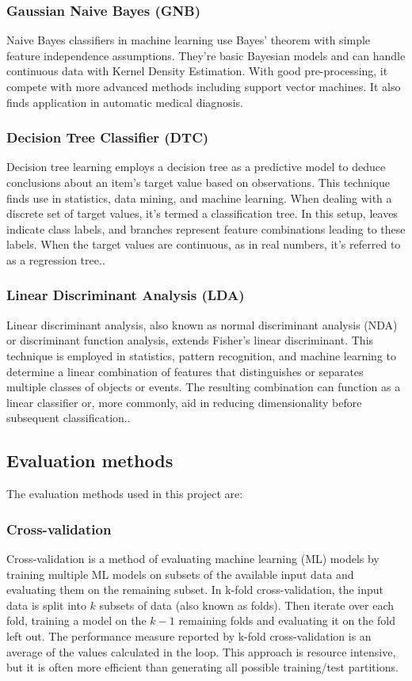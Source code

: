 	\subsubsection*{Gaussian Naive Bayes (GNB)}
		Naive Bayes classifiers in machine learning use Bayes' theorem with simple feature independence assumptions. They're basic Bayesian models and can handle continuous data with Kernel Density Estimation. With good pre-processing, it compete with more advanced methods including support vector machines. It also finds application in automatic medical diagnosis\cite{perez2006supervised}.
	
	\subsubsection*{Decision Tree Classifier (DTC)}
		Decision tree learning employs a decision tree as a predictive model to deduce conclusions about an item's target value based on observations. This technique finds use in statistics, data mining, and machine learning. When dealing with a discrete set of target values, it's termed a classification tree. In this setup, leaves indicate class labels, and branches represent feature combinations leading to these labels. When the target values are continuous, as in real numbers, it's referred to as a regression tree.\cite{navada2011overview}.
	
	\subsubsection*{Linear Discriminant Analysis (LDA)}
		Linear discriminant analysis, also known as normal discriminant analysis (NDA) or discriminant function analysis, extends Fisher's linear discriminant. This technique is employed in statistics, pattern recognition, and machine learning to determine a linear combination of features that distinguishes or separates multiple classes of objects or events. The resulting combination can function as a linear classifier or, more commonly, aid in reducing dimensionality before subsequent classification.\cite{izenman2013linear}.

\subsection{Evaluation methods}
	The evaluation methods used in this project are:
	\subsubsection{Cross-validation}
		Cross-validation is a method of evaluating machine learning (ML) models by training multiple ML models on subsets of the available input data and evaluating them on the remaining subset\cite{browne2000cross}. In k-fold cross-validation, the input data is split into $k$ subsets of data (also known as folds). Then iterate over each fold, training a model on the $k-1$ remaining folds and evaluating it on the fold left out. The performance measure reported by k-fold cross-validation is an average of the values calculated in the loop. This approach is resource intensive, but it is often more efficient than generating all possible training/test partitions\cite{browne2000cross}.

